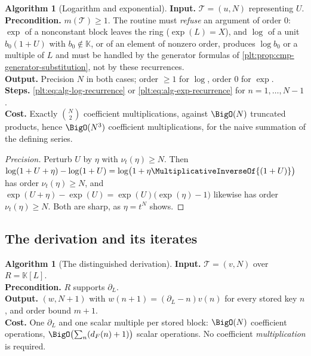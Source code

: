 \documentclass[11pt,oneside]{article}
\theoremstyle{plain}
\theoremstyle{definition}
\newtheorem{algorithm}[theorem]{Algorithm}
\theoremstyle{remark}
\newcommand{\K}{\mathbb{K}}
\newcommand{\ordt}{\nu_{t}}                              %
\newcommand{\dprofile}[1]{d_{#1}}                        %
\begin{document}
\begin{algorithm}[Logarithm and exponential]\label{plt:alg:explog}
\textbf{Input.}  \(\mathcal T=(u,N)\) representing \(U\).\\
\textbf{Precondition.}  \(m(\mathcal T)\ge1\).  The routine must \emph{refuse}
an argument of order \(0\): \(\exp\) of a nonconstant block leaves the ring
(\(\exp(L)=X\)), and \(\log\) of a unit \(b_0(1+U)\) with \(b_0\notin\K\), or of
an element of nonzero order, produces \(\log b_0\) or a multiple of \(L\) and
must be handled by the generator formulas of
\cref{plt:prop:cmp-generator-substitution}, not by these recurrences.\\
\textbf{Output.}  Precision \(N\) in both cases; order \(\ge1\) for \(\log\),
order \(0\) for \(\exp\).\\
\textbf{Steps.}  \cref{plt:eq:alg-log-recurrence} or
\cref{plt:eq:alg-exp-recurrence} for \(n=1,\dots,N-1\).\\
\textbf{Cost.}  Exactly \(\binom{N}{2}\) coefficient multiplications, against
\(\BigO(N)\) truncated products, hence \(\BigO(N^3)\) coefficient
multiplications, for the naive summation of the defining series.
\end{algorithm}

\begin{proof}[Precision]
Perturb \(U\) by \(\eta\) with \(\ordt(\eta)\ge N\).  Then
\(\log(1+U+\eta)-\log(1+U)=\log\bigl(1+\eta\MultiplicativeInverseOf{(1+U)}\bigr)\)
has order \(\ordt(\eta)\ge N\), and
\(\exp(U+\eta)-\exp(U)=\exp(U)\bigl(\exp(\eta)-1\bigr)\) likewise has order
\(\ordt(\eta)\ge N\).  Both are sharp, as \(\eta=t^N\) shows.
\end{proof}

\subsection{The derivation and its iterates}
\label{plt:sec:alg-derivation}

\begin{algorithm}[The distinguished derivation]\label{plt:alg:derivative}
\textbf{Input.}  \(\mathcal T=(v,N)\) over \(R=\K[L]\).\\
\textbf{Precondition.}  \(R\) supports \(\partial_L\).\\
\textbf{Output.}  \((w,N+1)\) with
\(w(n+1)=(\partial_L-n)v(n)\) for every stored key \(n\), and order bound
\(m+1\).\\
\textbf{Cost.}  One \(\partial_L\) and one scalar multiple per stored block:
\(\BigO(N)\) coefficient operations, \(\BigO\bigl(\sum_n(\dprofile{F}(n)+1)\bigr)\)
scalar operations.  No coefficient \emph{multiplication} is required.
\end{algorithm}
\end{document}
